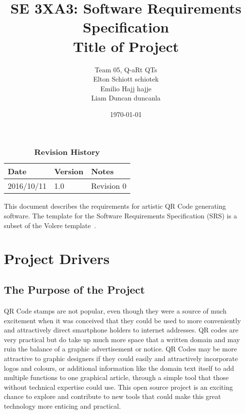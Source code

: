 \documentclass[12pt, titlepage]{article}
\title{SE 3XA3: Software Requirements Specification\\Title of Project}
\author{Team 05, Q-aRt QTs
		\\ Elton Schiott schiotek
		\\ Emilio Hajj hajje
		\\ Liam Duncan duncanla
}
\date{\today}
\begin{document}
\maketitle

\tableofcontents
\listoftables
\listoffigures

\begin{table}[bp]
\caption{\bf Revision History}
\begin{tabularx}{\textwidth}{p{3cm}p{2cm}X}
\toprule {\bf Date} & {\bf Version} & {\bf Notes}\\
\midrule
2016/10/11 & 1.0 & Revision 0\\
\bottomrule
\end{tabularx}
\end{table}

\newpage


This document describes the requirements for artistic QR Code generating 
software.  The template for the Software
Requirements Specification (SRS) is a subset of the Volere
template~\citep{RobertsonAndRobertson2012}.  

\section{Project Drivers}

\subsection{The Purpose of the Project}

	\paragraph{}
		
		QR Code stamps are not popular, even though they were a source of much 
		excitement when it was conceived that they could be used to more 
		conveniently and attractively direct smartphone holders to internet 
		addresses. QR codes are very practical but do take up much more space 
		that a written domain and may ruin the balance of a graphic 
		advertisement or notice. QR Codes may be more attractive to graphic 
		designers if they could easily and attractively incorporate logos and 
		colours, or additional information like the domain text itself to add 
		multiple functions to one graphical article, through a simple tool that 
		those without technical expertise could use. This open source project 
		is an exciting chance to explore and contribute to new tools that could 
		make this great technology more enticing and practical.
\end{document}
